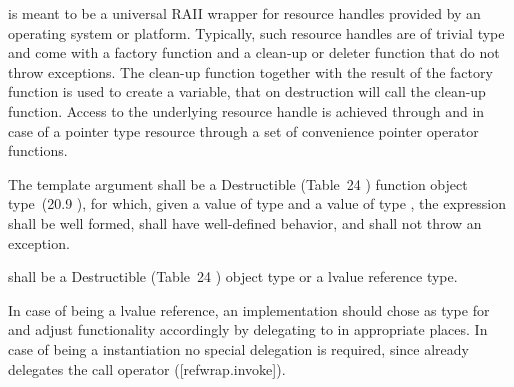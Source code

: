 \documentclass[ebook,11pt,article]{memoir}
\begin{document}
\pnum
\begin{note}
 is meant to be a universal RAII wrapper for resource handles provided by an operating system or platform.
Typically, such resource handles are of trivial type and come with a factory function and a clean-up or deleter function that do not throw exceptions.
The clean-up function together with the result of the factory function is used to create a  variable, that on destruction will call the clean-up function. Access to the underlying resource handle is achieved through  and in case of a pointer type resource through a set of convenience pointer operator functions.
\end{note}


\pnum 
The template argument
 shall be a 
Destructible 
(Table~24
) function object type~(20.9
), 
for which, given
a value  of type  and a value
 of type , the expression
 shall be well formed, shall have well-defined behavior, and shall not throw an exception.

\pnum
{} shall be a
Destructible 
(Table~24
) object type 
or a lvalue reference type.

\pnum
\begin{note} In case of  being a lvalue reference, an implementation should chose  as type for  and adjust functionality accordingly by delegating to  in appropriate places. In case of  being a  instantiation no special delegation is required, since  already delegates the call operator ([refwrap.invoke]).
\end{note} %

\pnum
\requires
{}\\
\end{document}
